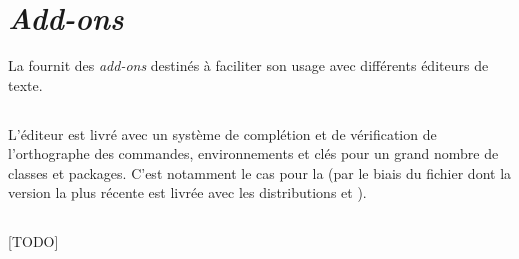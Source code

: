 \chapter{\emph{Add-ons}}\label{cha-add-ons}

La \yatCl{} fournit des \emph{add-ons} destinés à faciliter son usage avec
différents éditeurs de texte.

\section{\texorpdfstring{\texstudio}{TeXstudio}}
\label{sec-texstudio}
%
%

%

L'éditeur \href{http://texstudio.sourceforge.net/}{\texstudio} est livré avec un
système de complétion et de vérification de l'orthographe des
commandes, environnements et clés pour un grand nombre de classes et
packages. C'est notamment le cas pour la \yatCl{} (par le biais du fichier
 dont la version la plus récente est livrée avec les
distributions \texlive{} et \miktex{}).


\section{\texorpdfstring{\emacs}{Emacs}}
\label{sec-emacs}
%
%

[TODO]

